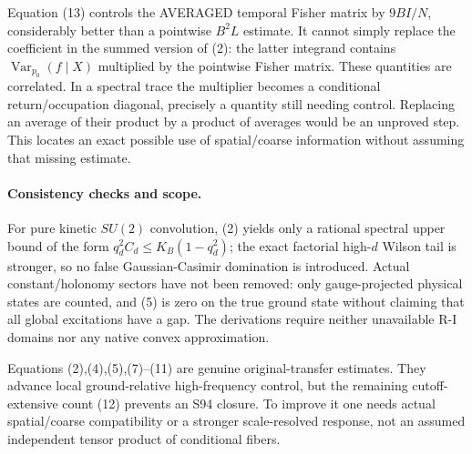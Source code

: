 \documentclass[11pt]{article}
\begin{document}
Equation (13) controls the AVERAGED temporal Fisher matrix by $9B I/N$,
considerably better than a pointwise $B^2 L$ estimate. It cannot simply replace
the coefficient in the summed version of (2): the latter integrand contains
$\operatorname{Var}_{p_0}(f\mid X)$ multiplied by the pointwise Fisher matrix.
These quantities are correlated. In a spectral trace the multiplier becomes a
conditional return/occupation diagonal, precisely a quantity still needing
control. Replacing an average of their product by a product of averages would
be an unproved step. This locates an exact possible use of spatial/coarse
information without assuming that missing estimate.

\paragraph{Consistency checks and scope.}
For pure kinetic $SU(2)$ convolution, (2) yields only a rational spectral upper
bound of the form $q_d^2 C_d\le K_B(1-q_d^2)$; the exact factorial high-$d$
Wilson tail is stronger, so no false Gaussian-Casimir domination is introduced.
Actual constant/holonomy sectors have not been removed: only gauge-projected
physical states are counted, and (5) is zero on the true ground state without
claiming that all global excitations have a gap. The derivations require neither
unavailable R-I domains nor any native convex approximation.

Equations (2),(4),(5),(7)--(11) are genuine original-transfer estimates. They
advance local ground-relative high-frequency control, but the remaining
cutoff-extensive count (12) prevents an S94 closure. To improve it one needs
actual spatial/coarse compatibility or a stronger scale-resolved response,
not an assumed independent tensor product of conditional fibers.
\end{document}
